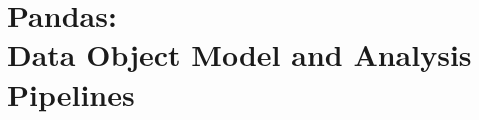 

\appendix
\setcounter{section}{3}
\section{Pandas:\\Data Object Model and Analysis Pipelines}








% 


% 
% 
% 
% 
% 
% 
% 
% 


% 
% 
% 
% 
% 
% 
% 
